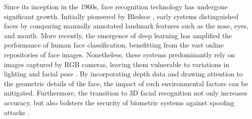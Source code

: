 \documentclass{mpaper}
\begin{document}
Since its inception in the 1960s, face recognition technology has undergone significant growth. Initially pioneered by Bledsoe \cite{bledsoe1966model}, early systems distinguished faces by comparing manually annotated landmark features such as the nose, eyes, and mouth. More recently, the emergence of deep learning has amplified the performance of human face classification, benefitting from the vast online repositories of face images. Nonetheless, these systems predominantly rely on images captured by RGB cameras, leaving them vulnerable to variations in lighting and facial pose \cite{xu2004depth}. By incorporating depth data and drawing attention to the geometric details of the face, the impact of such environmental factors can be mitigated. Furthermore, the transition to 3D facial recognition not only increases accuracy, but also bolsters the security of biometric systems against spoofing attacks \cite{wen2015face}.
\end{document}
